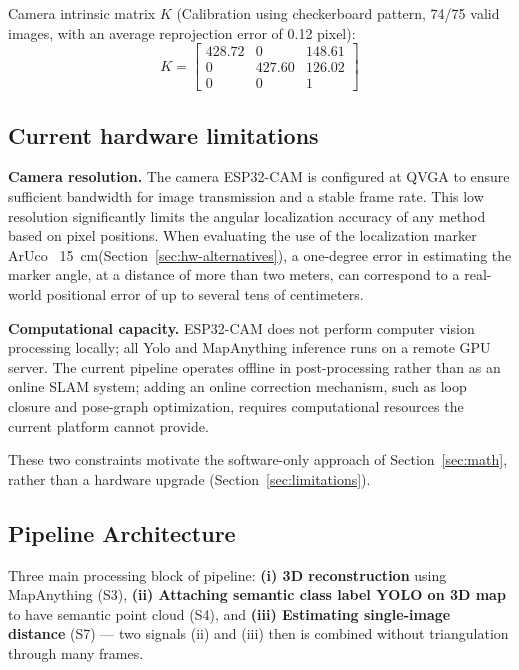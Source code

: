 \documentclass[conference]{IEEEtran}
\begin{document}
Camera intrinsic matrix $K$ (Calibration using checkerboard pattern, 74/75 valid images, with an average reprojection error of 0.12 pixel):
\[
K = \begin{bmatrix}
428.72 & 0 & 148.61 \\
0 & 427.60 & 126.02 \\
0 & 0 & 1
\end{bmatrix}
\label{tab:intrinsics}
\]

\subsection{Current hardware limitations}
\label{sec:hw-limits}

\textbf{Camera resolution.} The camera ESP32-CAM is configured at QVGA to ensure sufficient bandwidth for image transmission and a stable frame rate. This low resolution significantly limits the angular localization accuracy of any method based on pixel positions. When evaluating the use of the localization marker ArUco~\cite{GARRIDOJURADO20142280} \SI{15}{\centi\meter}(Section~\ref{sec:hw-alternatives}), a one-degree error in estimating the marker angle, at a distance of more than two meters, can correspond to a real-world positional error of up to several tens of centimeters.

\textbf{Computational capacity.} ESP32-CAM does not perform computer vision processing locally; all Yolo and MapAnything inference runs on a remote GPU server. The current pipeline operates offline in post-processing rather than as an online SLAM system; adding an online correction mechanism, such as loop closure and pose-graph optimization, requires computational resources the current platform cannot provide. 

These two constraints motivate the software-only approach of Section~\ref{sec:math}, rather than a hardware upgrade (Section~\ref{sec:limitations}).

\subsection{Pipeline Architecture}

Three main processing block of pipeline: \textbf{(i) 3D reconstruction} using MapAnything (S3), \textbf{(ii) Attaching semantic class label YOLO on 3D map} to have semantic point cloud (S4), and \textbf{(iii) Estimating single-image distance} (S7) — two signals (ii) and (iii) then is combined without triangulation through many frames.
\end{document}
